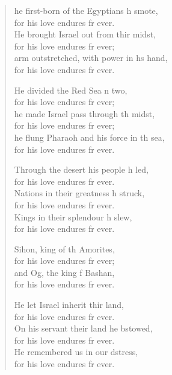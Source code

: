 \settowidth{\versewidth}{he flung Pharaoh and his force in the sea, *}
\begin{verse}%
  \begin{patverse}
he first-born of the Egyptians h smote,\Med\\
    for his love endures fr ever.\\
He brought Israel out from thir midst,\Med\\
    for his love endures fr ever;\\
arm outstretched, with power in h\pointup{\i}s hand,\Med\\
    for his love endures fr ever.

He divided the Red Sea \pointup{\i}n two,\Med\\
    for his love endures fr ever;\\
he made Israel pass through th midst,\Med\\
    for his love endures fr ever;\\
he flung Pharaoh and his force in th sea,\Med\\
    for his love endures fr ever.

Through the desert his people h led,\Med\\
    for his love endures fr ever.\\
Nations in their greatness h struck,\Med\\
    for his love endures fr ever.\\
Kings in their splendour h slew,\Med\\
    for his love endures fr ever.

Sihon, king of th Amorites,\Med\\
    for his love endures fr ever;\\
and Og, the king f Bashan,\Med\\
    for his love endures fr ever.

He let Israel inherit thir land,\Med\\
    for his love endures fr ever.\\
On his servant their land he bstowed,\Med\\
    for his love endures fr ever.\\
He remembered us in our d\pointup{\i}stress,\Med\\
    for his love endures fr ever.


\end{patverse}
\end{verse}

